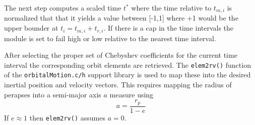 The next step computes a scaled time $t^{\ast}$ where the time relative to $t_{m,i}$ is normalized that that it yields a value between [-1,1] where +1 would be the upper bounder at $t_{i} = t_{m,i} + t_{r,i}$.  If there is a cap in the time intervals the module is set to fail high or low relative to the nearest time interval. 


After selecting the proper set of Chebyshev coefficients for the current time interval the corresponding orbit elements are retrieved.  The {\tt elem2rv()} function of the {\tt orbitalMotion.c/h} support library is used to map these into the desired inertial position and velocity vectors.  This requires mapping the radius of perapses into a semi-major axis $a$ measure using
\begin{equation}
	a = \frac{r_{p}}{1-e}
\end{equation}
If $e \approx 1$ then {\tt elem2rv()} assumes $a = 0$.  
